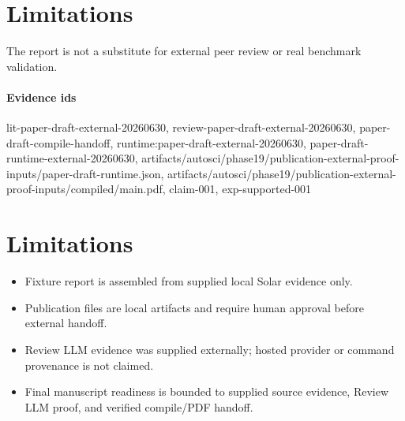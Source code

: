 \documentclass{article}
\begin{document}
\section{Limitations}
The report is not a substitute for external peer review or real benchmark validation.

\paragraph{Evidence ids} lit-paper-draft-external-20260630, review-paper-draft-external-20260630, paper-draft-compile-handoff, runtime:paper-draft-external-20260630, paper-draft-runtime-external-20260630, artifacts/autosci/phase19/publication-external-proof-inputs/paper-draft-runtime.json, artifacts/autosci/phase19/publication-external-proof-inputs/compiled/main.pdf, claim-001, exp-supported-001

\section{Limitations}

\begin{itemize}\item Fixture report is assembled from supplied local Solar evidence only.\end{itemize}
\begin{itemize}\item Publication files are local artifacts and require human approval before external handoff.\end{itemize}
\begin{itemize}\item Review LLM evidence was supplied externally; hosted provider or command provenance is not claimed.\end{itemize}
\begin{itemize}\item Final manuscript readiness is bounded to supplied source evidence, Review LLM proof, and verified compile/PDF handoff.\end{itemize}
\end{document}
